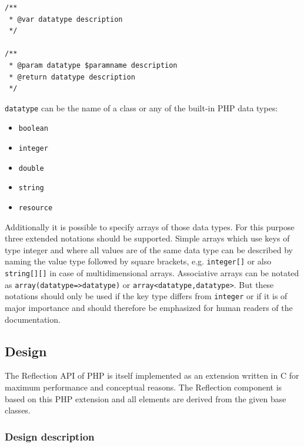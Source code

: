 \documentclass[10pt,final,a4paper,oneside]{article}
\begin{document}
\begin{verbatim}
/**
 * @var datatype description
 */

/**
 * @param datatype $paramname description
 * @return datatype description
 */
\end{verbatim}

\noindent
\verb|datatype| can be the name of a class
or any of the built-in PHP data types:

\begin{itemize}
	\item \verb|boolean|
	\item \verb|integer|
	\item \verb|double|
	\item \verb|string|
	\item \verb|resource|
\end{itemize}

Additionally it is possible to specify arrays of those
data types.
For this purpose three extended notations should be supported.
Simple arrays which use keys of type integer and
where all values are of the same data type
can be described by naming the value type followed by square brackets,
e.g. \verb|integer[]| or also \verb|string[][]|
in case of multidimensional arrays.
Associative arrays can be notated as
\verb|array(datatype=>datatype)| or \verb|array<datatype,datatype>|.
But these notations should only be used
if the key type differs from \verb|integer|
or if it is of major importance
and should therefore be emphasized
for human readers of the documentation. 


\subsection{Design}\label{subsec:ReflectionDesign}
%
%

The Reflection API of PHP \cite{PHP5Reflection}
is itself implemented as an extension written in C
for maximum performance and conceptual reasons.
The Reflection component is based on this PHP extension
and all elements are derived from the given base classes.

\subsubsection{Design description}
\end{document}
